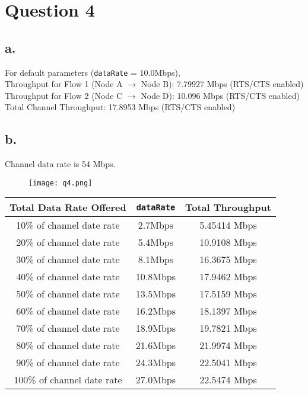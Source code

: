 \documentclass[11pt, fleqn]{article}
\begin{document}
\newpage 
\section*{Question 4}
\setcounter{equation}{0}

\subsection*{a.}

For default parameters (\texttt{dataRate} = 10.0Mbps),\\

Throughput for Flow 1 (Node A $\rightarrow$ Node B): 7.79927 Mbps (RTS/CTS enabled) \\
Throughput for Flow 2 (Node C $\rightarrow$ Node D): 10.096 Mbps (RTS/CTS enabled) \\

Total Channel Throughput: 17.8953 Mbps (RTS/CTS enabled) \\

\subsection*{b.}

Channel data rate is 54 Mbps.

\begin{figure}[H]
    \centering
    \texttt{[image: q4.png]}
\end{figure}

\begin{table}[H]
    \centering
    \begin{tabular}{||c|c||c||}
         \hline
         Total Data Rate Offered & \texttt{dataRate} & Total Throughput \\
         \hline %
         10\% of channel date rate & 2.7Mbps & 5.45414 Mbps \\
         \hline %
         20\% of channel date rate & 5.4Mbps & 10.9108 Mbps \\
         \hline %
         30\% of channel date rate & 8.1Mbps & 16.3675 Mbps \\
         \hline %
         40\% of channel date rate & 10.8Mbps & 17.9462 Mbps \\
         \hline %
         50\% of channel date rate & 13.5Mbps & 17.5159 Mbps \\
         \hline %
         60\% of channel date rate & 16.2Mbps & 18.1397 Mbps \\
         \hline %
         70\% of channel date rate & 18.9Mbps & 19.7821 Mbps \\
         \hline %
         80\% of channel date rate & 21.6Mbps & 21.9974 Mbps \\
         \hline %
         90\% of channel date rate & 24.3Mbps & 22.5041 Mbps \\
         \hline %
         100\% of channel date rate & 27.0Mbps & 22.5474 Mbps \\
         \hline         
    \end{tabular}
\end{table}
\end{document}

